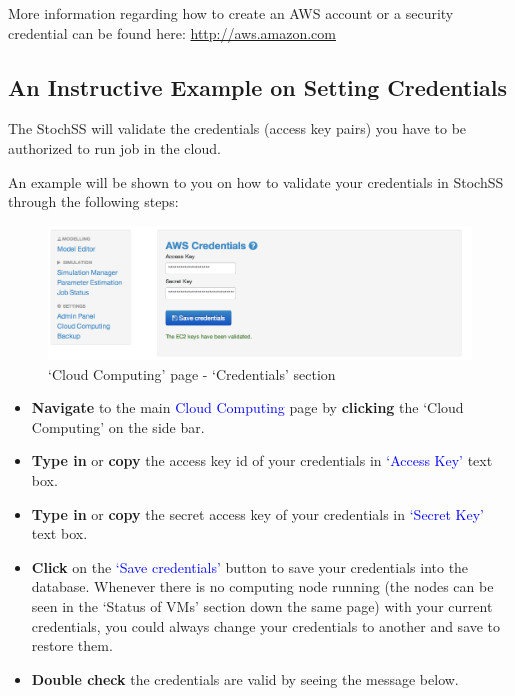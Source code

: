 \documentclass[12pt,notitlepage,nofootinbib]{revtex4}
\begin{document}
More information regarding how to create an AWS account or a security credential can be found here: \url{http://aws.amazon.com}

\subsection{An Instructive Example on Setting Credentials}
The StochSS will validate the credentials (access key pairs) you have to be authorized to run job in the cloud. 

An example will be shown to you on how to validate your credentials in StochSS through the following steps:

\begin{figure}[!ht]
\centering
\includegraphics[scale=0.45]{T6_fig_credentials.png}
\caption{`Cloud Computing' page - `Credentials' section}
\label{fig:2}
\end{figure}

\begin{itemize}
\item \textbf{Navigate} to the main \textcolor{blue}{Cloud Computing} page by \textbf{clicking} the `Cloud Computing' on the side bar.
\item \textbf{Type in} or \textbf{copy} the access key id of your credentials in \textcolor{blue}{`Access Key'} text box.
 \item \textbf{Type in} or \textbf{copy} the secret access key of your credentials in \textcolor{blue}{`Secret Key'} text box. 
 \item \textbf{Click} on the \textcolor{blue}{`Save credentials'} button to save your credentials into the database. Whenever there is no computing node running (the nodes can be seen in the `Status of VMs' section down the same page) with your current credentials, you could always change your credentials to another and save to restore them.
 \item \textbf{Double check} the credentials are valid by seeing the message below.

\end{itemize}
\end{document}
